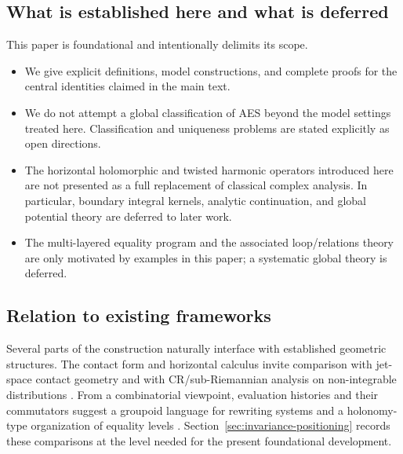 \subsection{What is established here and what is deferred}\label{subsec:intro-scope}

This paper is foundational and intentionally delimits its scope.

\begin{itemize}
    \item We give explicit definitions, model constructions, and complete proofs for the central identities claimed in the main text.
    \item We do not attempt a global classification of AES beyond the model settings treated here. Classification and uniqueness problems are stated explicitly as open directions.
    \item The horizontal holomorphic and twisted harmonic operators introduced here are not presented as a full replacement of classical complex analysis. In particular, boundary integral kernels, analytic continuation, and global potential theory are deferred to later work.
    \item The multi-layered equality program and the associated loop/relations theory are only motivated by examples in this paper; a systematic global theory is deferred.
\end{itemize}

\subsection{Relation to existing frameworks}\label{subsec:intro-related}

Several parts of the construction naturally interface with established geometric structures. The contact form and horizontal calculus invite comparison with jet-space contact geometry and with CR/sub-Riemannian analysis on non-integrable distributions \cite{Darboux1882Pfaff,Geiges2001BriefHistory,Geiges2008IntroContact}. From a combinatorial viewpoint, evaluation histories and their commutators suggest a groupoid language for rewriting systems and a holonomy-type organization of equality levels \cite{Post1943FormalRO,Chomsky1956ThreeMF}. Section~\ref{sec:invariance-positioning} records these comparisons at the level needed for the present foundational development.
